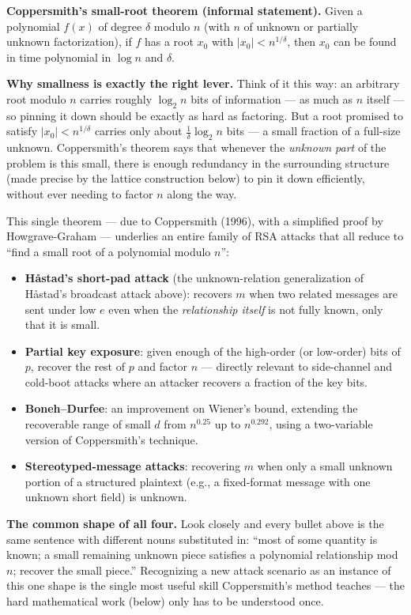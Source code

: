 \medskip\noindent\textbf{Coppersmith's small-root theorem (informal statement).} Given a polynomial $f(x)$ of degree $\delta$ modulo $n$ (with $n$ of unknown or partially unknown factorization), if $f$ has a root $x_0$ with $|x_0| < n^{1/\delta}$, then $x_0$ can be found in time polynomial in $\log n$ and $\delta$.

\medskip\noindent\textbf{Why smallness is exactly the right lever.} Think of it this way: an arbitrary root modulo $n$ carries roughly $\log_2 n$ bits of information — as much as $n$ itself — so pinning it down should be exactly as hard as factoring. But a root promised to satisfy $|x_0|<n^{1/\delta}$ carries only about $\frac{1}{\delta}\log_2 n$ bits — a small fraction of a full-size unknown. Coppersmith's theorem says that whenever the \emph{unknown part} of the problem is this small, there is enough redundancy in the surrounding structure (made precise by the lattice construction below) to pin it down efficiently, without ever needing to factor $n$ along the way.

This single theorem — due to Coppersmith (1996), with a simplified proof by Howgrave-Graham — underlies an entire family of RSA attacks that all reduce to ``find a small root of a polynomial modulo $n$'':

\begin{itemize}
\item \textbf{Håstad's short-pad attack} (the unknown-relation generalization of Håstad's broadcast attack above): recovers $m$ when two related messages are sent under low $e$ even when the \emph{relationship itself} is not fully known, only that it is small.
\item \textbf{Partial key exposure}: given enough of the high-order (or low-order) bits of $p$, recover the rest of $p$ and factor $n$ — directly relevant to side-channel and cold-boot attacks where an attacker recovers a fraction of the key bits.
\item \textbf{Boneh--Durfee}: an improvement on Wiener's bound, extending the recoverable range of small $d$ from $n^{0.25}$ up to $n^{0.292}$, using a two-variable version of Coppersmith's technique.
\item \textbf{Stereotyped-message attacks}: recovering $m$ when only a small unknown portion of a structured plaintext (e.g., a fixed-format message with one unknown short field) is unknown.
\end{itemize}

\medskip\noindent\textbf{The common shape of all four.} Look closely and every bullet above is the same sentence with different nouns substituted in: ``most of some quantity is known; a small remaining unknown piece satisfies a polynomial relationship mod $n$; recover the small piece.'' Recognizing a new attack scenario as an instance of this one shape is the single most useful skill Coppersmith's method teaches — the hard mathematical work (below) only has to be understood once.

